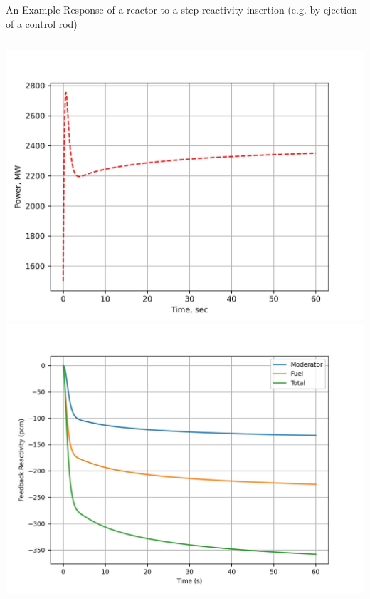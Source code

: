 \documentclass[10pt,compress]{beamer}
\begin{document}
\begin{frame}{An Example}
    Response of a reactor to a step reactivity insertion (e.g. by ejection of a control rod)
    \begin{columns}
        \begin{column}{5cm}
            \includegraphics[width=0.9\linewidth]{images/powerCase1.jpg}
            \includegraphics[width=0.9\linewidth]{images/feedbackCase1.jpg}

\end{column}
\end{columns}
\end{frame}
\end{document}
